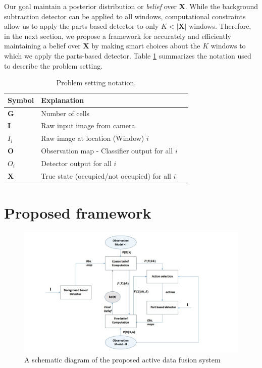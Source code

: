 \documentclass[10pt,twocolumn,letterpaper]{article}
\begin{document}
Our goal maintain a posterior distribution or \emph{belief} over $\mathbf{X}$.  While the background subtraction detector can be applied to all windows, computational constraints allow us to apply the parts-based detector to only $K < |\mathbf{X}|$ windows.  Therefore, in the next section, we propose a framework for accurately and efficiently maintaining a belief over $\mathbf{X}$ by making smart choices about the $K$ windows to which we apply the parts-based detector.  Table \ref{tab:Formal symbols} summarizes the notation used to describe the problem setting.

\begin{table}[ht] 
  \begin{tabular}{lll}
   \hline
   Symbol & Explanation \\
   \hline
   $\textbf{G} $ & Number of cells\\
   $ \textbf{I} $ & Raw input image from camera.\\
   $ I_{i} $ & Raw image at location (Window) $ i$\\
   $ \textbf{O} $ & Observation map - Classifier output for all  $ i $\\
   $O_{i} $& Detector output for all $ i $\\
   $\textbf{X}$& True state (occupied/not occupied) for all $i$\\
   \hline
  \end{tabular}
  \caption{%
    Problem setting notation. 
  }
  \label{tab:Formal symbols}
\end{table}

\section{Proposed framework}

\begin{figure}
\begin{center}
\includegraphics[width=12cm]{img/newBlockdia.jpg}
\end{center}
   \caption{A schematic diagram of the proposed active data fusion system}
\label{fig:Block dia}
\end{figure}
\end{document}
